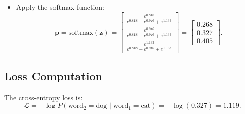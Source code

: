 \begin{notechapter}
\begin{itemize}
\[          \begin{bmatrix}
          0.3 \\
          0.4 \\
          0.5
          \end{bmatrix} =
          \begin{bmatrix}
          0.7 \cdot 0.197 + 1.0 \cdot 0.380 + 0.3 \\
          0.8 \cdot 0.197 + 1.1 \cdot 0.380 + 0.4 \\
          0.9 \cdot 0.197 + 1.2 \cdot 0.380 + 0.5
          \end{bmatrix} =
          \begin{bmatrix}
          0.138 + 0.380 + 0.3 \\
          0.158 + 0.418 + 0.4 \\
          0.177 + 0.456 + 0.5
          \end{bmatrix} =
          \begin{bmatrix}
          0.818 \\
          0.976 \\
          1.133
          \end{bmatrix}.
          \]
    \item Apply the softmax function:
          \[
          \mathbf{p} = \text{softmax}(\mathbf{z}) =
          \begin{bmatrix}
          \frac{e^{0.818}}{e^{0.818} + e^{0.976} + e^{1.133}} \\
          \frac{e^{0.976}}{e^{0.818} + e^{0.976} + e^{1.133}} \\
          \frac{e^{1.133}}{e^{0.818} + e^{0.976} + e^{1.133}}
          \end{bmatrix} =
          \begin{bmatrix}
          0.268 \\
          0.327 \\
          0.405
          \end{bmatrix}.
          \]
\end{itemize}

\subsection{Loss Computation}
The cross-entropy loss is:
\[
\mathcal{L} = -\log P(\text{word}_2 = \text{dog} \mid \text{word}_1 = \text{cat}) = -\log(0.327) = 1.119.
\]


\end{notechapter}
